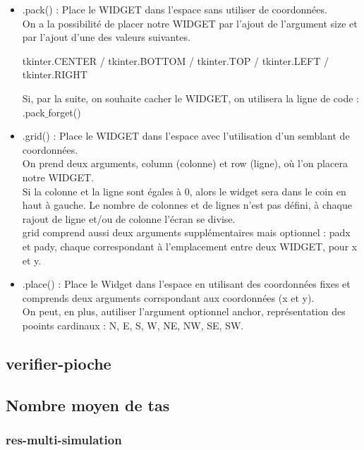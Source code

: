 \documentclass[french, titlepage]{article}
\begin{document}
    \begin{itemize}
    
    \item .pack() : %
    Place le WIDGET dans l'espace sans utiliser de coordonnées.\\
    On a la possibilité de placer notre WIDGET par l'ajout de l'argument size et par l'ajout d'une des valeurs suivantes.
    
    tkinter.CENTER  /  tkinter.BOTTOM  / tkinter.TOP  /  tkinter.LEFT  / tkinter.RIGHT
    
    Si, par la suite, on souhaite cacher le WIDGET, on utilisera la ligne de code : .pack$\_$forget()
    \\
    
	\item .grid() : %
    Place le WIDGET dans l'espace avec l'utilisation d'un semblant de coordonnées.\\
    On prend deux arguments, column (colonne) et row (ligne), où l'on placera notre WIDGET.\\
    Si la colonne et la ligne sont égales à 0, alors le widget sera dans le coin en haut à gauche.
    Le nombre de colonnes et de lignes n'est pas défini, à chaque rajout de ligne et/ou de colonne l'écran se divise.\\
    grid comprend aussi deux arguments supplémentaires mais optionnel : padx et pady, chaque correspondant à l'emplacement entre deux WIDGET, pour x et y.
    \\
    
    \item .place() : %
    Place le Widget dans l'espace en utilisant des coordonnées fixes et comprends deux arguments corrspondant aux coordonnées (x et y).\\
    On peut, en plus, autiliser l'argument optionnel anchor, représentation des pooints cardinaux : N, E, S, W, NE, NW, SE, SW.
    \\
    \end{itemize}
    
    \subsection{\ttfamily verifier-pioche}
    \subsection{Nombre moyen de tas}
        \subsubsection{\ttfamily res-multi-simulation}
\end{document}
